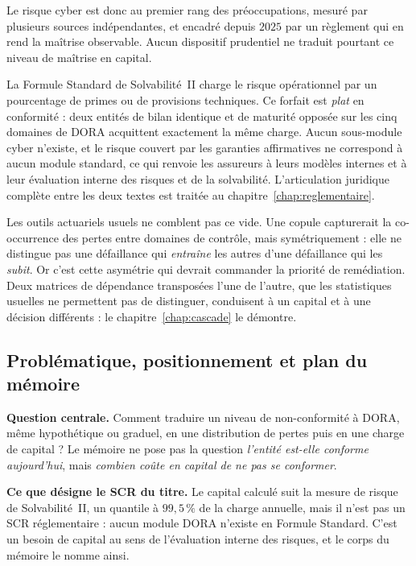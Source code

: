 Le risque cyber est donc au premier rang des préoccupations, mesuré par plusieurs sources
indépendantes, et encadré depuis $2025$ par un règlement qui en rend la maîtrise observable.
Aucun dispositif prudentiel ne traduit pourtant ce niveau de maîtrise en capital.

La Formule Standard de Solvabilité~II charge le risque opérationnel par un pourcentage de primes
ou de provisions techniques. Ce forfait est \emph{plat} en conformité : deux entités de bilan
identique et de maturité opposée sur les cinq domaines de DORA acquittent exactement la même
charge. Aucun sous-module cyber n'existe, et le risque couvert par les garanties affirmatives ne
correspond à aucun module standard, ce qui renvoie les assureurs à leurs modèles internes et à
leur évaluation interne des risques et de la solvabilité. L'articulation juridique complète entre
les deux textes est traitée au chapitre~\ref{chap:reglementaire}.

Les outils actuariels usuels ne comblent pas ce vide. Une copule capturerait la co-occurrence des
pertes entre domaines de contrôle, mais symétriquement : elle ne distingue pas une défaillance
qui \emph{entraîne} les autres d'une défaillance qui les \emph{subit}. Or c'est cette asymétrie
qui devrait commander la priorité de remédiation. Deux matrices de dépendance transposées l'une
de l'autre, que les statistiques usuelles ne permettent pas de distinguer, conduisent à un
capital et à une décision différents : le chapitre~\ref{chap:cascade} le démontre.

\subsection{Problématique, positionnement et plan du mémoire}
\label{subsec:problematique-positionnement}

\begin{cle}
\textbf{Question centrale.} Comment traduire un niveau de non-conformité à DORA, même
hypothétique ou graduel, en une distribution de pertes puis en une charge de capital ? Le mémoire
ne pose pas la question \emph{l'entité est-elle conforme aujourd'hui}, mais \emph{combien coûte en
capital de ne pas se conformer}.

\textbf{Ce que désigne le SCR du titre.} Le capital calculé suit la mesure de risque de
Solvabilité~II, un quantile à $99{,}5\,\%$ de la charge annuelle, mais il n'est pas un SCR
réglementaire : aucun module DORA n'existe en Formule Standard. C'est un besoin de capital au
sens de l'évaluation interne des risques, et le corps du mémoire le nomme ainsi.
\end{cle}

